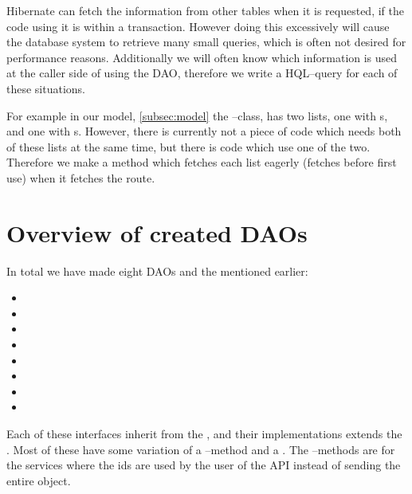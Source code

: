 Hibernate can fetch the information from other tables when it is requested, if the code using it is within a transaction.
However doing this excessively will cause the database system to retrieve many small queries, which is often not desired for performance reasons.
Additionally we will often know which information is used at the caller side of using the \ac{DAO},
therefore we write a \ac{HQL}--query for each of these situations.

For example in our model, \cref{subsec:model} the --class, has two lists,
one with s, and one with s.
However, there is currently not a piece of code which needs both of these lists at the same time, but there is code which use one of the two.
Therefore we make a method which fetches each list eagerly (fetches before first use) when it fetches the route.

\section{Overview of created \acp{DAO}}
In total we have made eight \acp{DAO} and the  mentioned earlier:
\begin{multicols}{2}
\begin{itemize}
    \item {}
    \item {}
    \item {}
    \item {}
    \item {}
    \item {}
    \item {}
    \item {}
\end{itemize}
\end{multicols}

Each of these interfaces inherit from the , and their implementations extends the .
Most of these have some variation of a --method and a .
The --methods are for the services where the ids are used by the user of the API instead of sending the entire object.

